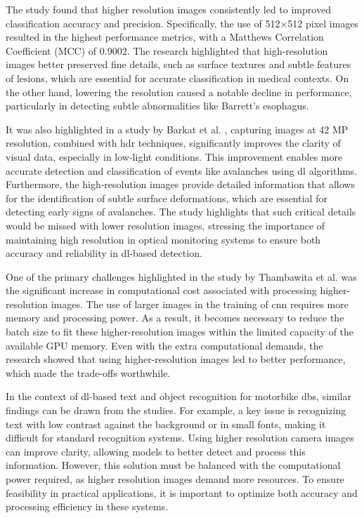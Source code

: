 The study \cite{RES_IMP} found that higher resolution images consistently led to improved classification accuracy and precision. Specifically, the use of 512×512 pixel images resulted in the highest performance metrics, with a Matthews Correlation Coefficient (MCC) of 0.9002. The research highlighted that high-resolution images better preserved fine details, such as surface textures and subtle features of lesions, which are essential for accurate classification in medical contexts. On the other hand, lowering the resolution caused a notable decline in performance, particularly in detecting subtle abnormalities like Barrett’s esophagus.

It was also highlighted in a study by Barkat et al. \cite{RES_HDR_IMP}, capturing images at 42 MP resolution, combined with \gls{hdr} techniques, significantly improves the clarity of visual data, especially in low-light conditions. This improvement enables more accurate detection and classification of events like avalanches using \gls{dl} algorithms. Furthermore, the high-resolution images provide detailed information that allows for the identification of subtle surface deformations, which are essential for detecting early signs of avalanches. The study highlights that such critical details would be missed with lower resolution images, stressing the importance of maintaining high resolution in optical monitoring systems to ensure both accuracy and reliability in \gls{dl}-based detection.

One of the primary challenges highlighted in the study by Thambawita et al. \cite{RES_IMP} was the significant increase in computational cost associated with processing higher-resolution images. The use of larger images in the training of \gls{cnn} requires more memory and processing power. As a result, it becomes necessary to reduce the batch size to fit these higher-resolution images within the limited capacity of the available GPU memory. Even with the extra computational demands, the research showed that using higher-resolution images led to better performance, which made the trade-offs worthwhile.

In the context of \gls{dl}-based text and object recognition for motorbike \gls{db}s, similar findings can be drawn from the studies. For example, a key issue is recognizing text with low contrast against the background or in small fonts, making it difficult for standard recognition systems. Using higher resolution camera images can improve clarity, allowing models to better detect and process this information. However, this solution must be balanced with the computational power required, as higher resolution images demand more resources. To ensure feasibility in practical applications, it is important to optimize both accuracy and processing efficiency in these systems.


